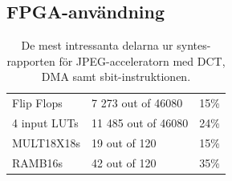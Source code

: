 \documentclass[a4paper]{article}
\begin{document}
\subsection{FPGA-användning}
\begin{table}[ht]
    \centering
    \begin{tabular}{l l l}
        Flip Flops   &      7 273 out of   46080  & 15\% \\
        4 input LUTs &      11 485 out of  46080  & 24\% \\
        MULT18X18s   &      19 out of 120  &   15\% \\
        RAMB16s      &      42 out of 120  &   35\% \\
    \end{tabular}
    \caption{ De mest intressanta delarna ur syntes-rapporten för JPEG-acceleratorn med DCT, DMA samt sbit-instruktionen. }
    \label{tab:fpga_usage}
\end{table}
%
%
%
%
\end{document}
